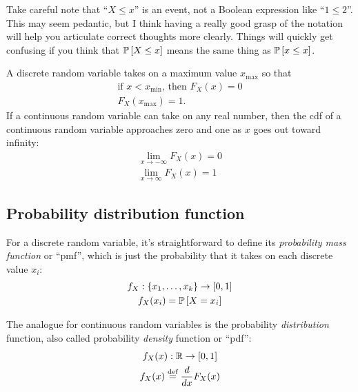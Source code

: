 Take careful note that ``$X \leq x$'' is an event, not a Boolean expression
like ``$1 \leq 2$''. This may seem pedantic, but I think having a really good
grasp of the notation will help you articulate correct thoughts more clearly.
Things will quickly get confusing if you think that $\mathbb{P}\left[{X \leq x}\right]$ means the same
thing as $\mathbb{P}\left[{x \leq x}\right]$.


A discrete random variable takes on a maximum value $x_\mathrm{max}$ so that
\begin{gather}
\text{if } x < x_\mathrm{min} \text{, then } F_X(x) = 0 \\
F_X(x_\mathrm{max}) = 1.
\end{gather}
If a continuous random variable can take on any real number, then  the cdf of
a continuous random variable approaches zero and one as $x$ goes out toward
infinity:
\begin{gather}
\lim_{x \to -\infty} F_X(x) = 0 \\
\lim_{x \to \infty} F_X(x) = 1
\end{gather}


\subsection{Probability distribution function}

For a discrete random variable, it's straightforward to define its
\emph{probability mass function} or ``pmf'', which is just the probability
that it takes on each discrete value $x_i$:
\begin{gather*}
f_X : \{x_1, \ldots, x_k\} \to [0, 1] \\
f_X(x_i) = \mathbb{P}\left[{X = x_i}\right]
\end{gather*}

The analogue for continuous random variables is the probability
\emph{distribution} function, also called probability \emph{density} function
or ``pdf'':
\begin{gather*}
f_X(x) : \mathbb{R} \to [0, 1] \\
f_X(x) \stackrel{\text{def}}{=} \frac{d}{dx} F_X(x)
\end{gather*}

